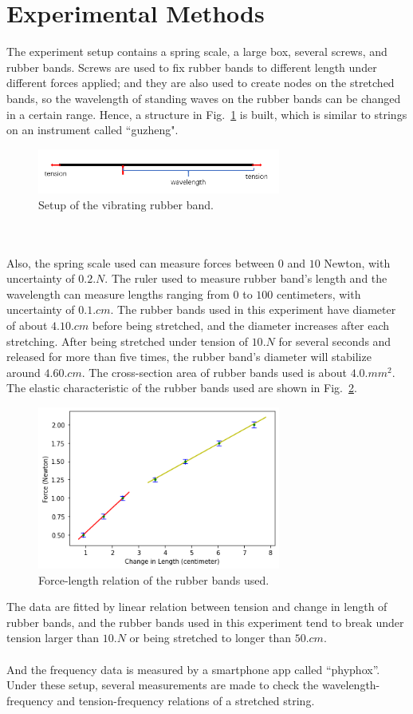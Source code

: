 \documentclass[twocolumn,preprintnumbers,amsmath,amssymb,longbibliography]{revtex4-1}
\begin{document}
\section{Experimental Methods}
    The experiment setup contains a spring scale, a large box, several screws, and rubber bands. Screws are used to fix rubber bands to different length under different forces applied; and they are also used to create nodes on the stretched bands, so the wavelength of standing waves on the rubber bands can be changed in a certain range. Hence, a structure in Fig.~\ref{rubber} is built, which is similar to strings on an instrument called ``guzheng".
\begin{figure}[H]
\centering
\includegraphics[width=8cm]{rubber.png}
\caption{\label{rubber} Setup of the vibrating rubber band.} 
\end{figure}
    \\
    \\
    Also, the spring scale used can measure forces between $0$ and $10$ Newton, with uncertainty of $0.2\si{.N}$. The ruler used to measure rubber band's length and the wavelength can measure lengths ranging from $0$ to $100$ centimeters, with uncertainty of $0.1 \si{.cm}$. The rubber bands used in this experiment have diameter of about $4.10 \si{.cm}$ before being stretched, and the diameter increases after each stretching. After being stretched under tension of $10\si{.N}$ for several seconds and released for more than five times, the rubber band's diameter will stabilize around $4.60\si{.cm}$. The cross-section area of rubber bands  used is about $4.0\si{.mm^2}$. The elastic characteristic of the rubber bands used are shown in Fig.~\ref{hook}.
\begin{figure}[H]
\centering
\includegraphics[width=8cm]{hook.png}
\caption{\label{hook} Force-length relation of the rubber bands used.} 
\end{figure}
    The data are fitted by linear relation between tension and change in length of rubber bands, and the rubber bands used in this experiment tend to break under tension larger than $10\si{.N}$ or being stretched to longer than $50\si{.cm}$.
    \\
    \\
    And the frequency data is measured by a smartphone app called ``phyphox''. 
    Under these setup, several measurements are made to check the wavelength-frequency and tension-frequency relations of a stretched string. 
\end{document}
